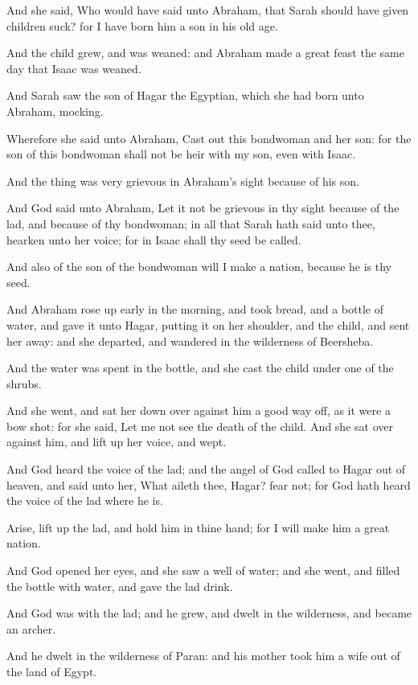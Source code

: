 \Verse And she said, Who would have said unto Abraham, that Sarah should have given children suck? for I have born him a son in his old age.

\Verse And the child grew, and was weaned: and Abraham made a great feast the same day that Isaac was weaned.

\Verse And Sarah saw the son of Hagar the Egyptian, which she had born unto Abraham, mocking.

\Verse Wherefore she said unto Abraham, Cast out this bondwoman and her son: for the son of this bondwoman shall not be heir with my son, even with Isaac.

\Verse And the thing was very grievous in Abraham's sight because of his son.

\Verse And God said unto Abraham, Let it not be grievous in thy sight because of the lad, and because of thy bondwoman; in all that Sarah hath said unto thee, hearken unto her voice; for in Isaac shall thy seed be called.

\Verse And also of the son of the bondwoman will I make a nation, because he is thy seed.

\Verse And Abraham rose up early in the morning, and took bread, and a bottle of water, and gave it unto Hagar, putting it on her shoulder, and the child, and sent her away: and she departed, and wandered in the wilderness of Beersheba.

\Verse And the water was spent in the bottle, and she cast the child under one of the shrubs.

\Verse And she went, and sat her down over against him a good way off, as it were a bow shot: for she said, Let me not see the death of the child. And she sat over against him, and lift up her voice, and wept.

\Verse And God heard the voice of the lad; and the angel of God called to Hagar out of heaven, and said unto her, What aileth thee, Hagar?  fear not; for God hath heard the voice of the lad where he is.

\Verse Arise, lift up the lad, and hold him in thine hand; for I will make him a great nation.

\Verse And God opened her eyes, and she saw a well of water; and she went, and filled the bottle with water, and gave the lad drink.

\Verse And God was with the lad; and he grew, and dwelt in the wilderness, and became an archer.

\Verse And he dwelt in the wilderness of Paran: and his mother took him a wife out of the land of Egypt.

